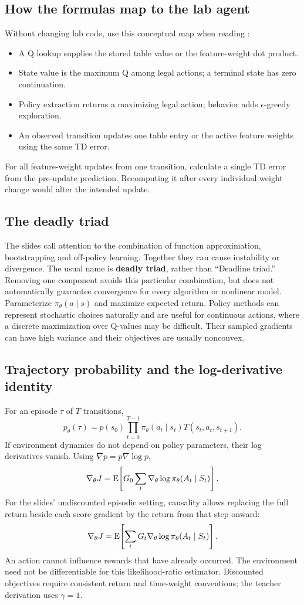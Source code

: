 \documentclass[11pt]{article}
\begin{document}
\subsection{How the formulas map to the lab agent}
Without changing lab code, use this conceptual map when reading :
\begin{itemize}
\item A Q lookup supplies the stored table value or the feature-weight dot product.
\item State value is the maximum Q among legal actions; a terminal state has zero continuation.
\item Policy extraction returns a maximizing legal action; behavior adds $\epsilon$-greedy exploration.
\item An observed transition updates one table entry or the active feature weights using the same TD error.
\end{itemize}
For all feature-weight updates from one transition, calculate a single TD error from the pre-update prediction. Recomputing it after every individual weight change would alter the intended update.
\subsection{The deadly triad}
The slides call attention to the combination of function approximation, bootstrapping and off-policy learning. Together they can cause instability or divergence. The usual name is \textbf{deadly triad}, rather than ``Deadline triad.'' Removing one component avoids this particular combination, but does not automatically guarantee convergence for every algorithm or nonlinear model.
Parameterize $\pi_\theta(a\mid s)$ and maximize expected return. Policy methods can represent stochastic choices naturally and are useful for continuous actions, where a discrete maximization over Q-values may be difficult. Their sampled gradients can have high variance and their objectives are usually nonconvex.
\subsection{Trajectory probability and the log-derivative identity}
For an episode $\tau$ of $T$ transitions,
\[
p_\theta(\tau)=p(s_0)\prod_{t=0}^{T-1}
\pi_\theta(a_t\mid s_t)T(s_t,a_t,s_{t+1}).
\]
If environment dynamics do not depend on policy parameters, their log derivatives vanish. Using $\nabla p=p\nabla\log p$,
\[
\nabla_\theta J=\operatorname{E}\!\left[G_0\sum_t\nabla_\theta\log\pi_\theta(A_t\mid S_t)\right].
\]
For the slides' undiscounted episodic setting, causality allows replacing the full return beside each score gradient by the return from that step onward:
\[
\nabla_\theta J=\operatorname{E}\!\left[\sum_tG_t\nabla_\theta\log\pi_\theta(A_t\mid S_t)\right].
\]
An action cannot influence rewards that have already occurred. The environment need not be differentiable for this likelihood-ratio estimator. Discounted objectives require consistent return and time-weight conventions; the teacher derivation uses $\gamma=1$.
\end{document}
